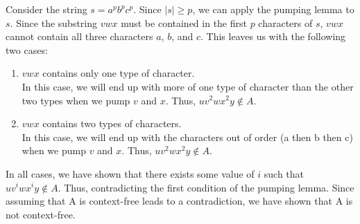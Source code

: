 \documentclass{article}
\begin{document}
Consider the string $s = a^pb^pc^p$. Since $|s| \geq p$, we can apply the pumping lemma to $s$. Since the substring $vwx$ must be contained in the first $p$ characters of $s$, $vwx$ cannot contain all three characters $a$, $b$, and $c$. This leaves us with the following two cases:

\begin{enumerate}
    \item $vwx$ contains only one type of character.\\
    In this case, we will end up with more of one type of character than the other two types when we pump $v$ and $x$. Thus, $uv^2wx^2y \notin A$.
    \item $vwx$ contains two types of characters.\\
    In this case, we will end up with the characters out of order (a then b then c) when we pump $v$ and $x$. Thus, $uv^2wx^2y \notin A$.
\end{enumerate}

In all cases, we have shown that there exists some value of $i$ such that $uv^iwx^iy \notin A$. Thus, contradicting the first condition of the pumping lemma. Since assuming that A is context-free leads to a contradiction, we have shown that A is not context-free.
\end{document}
